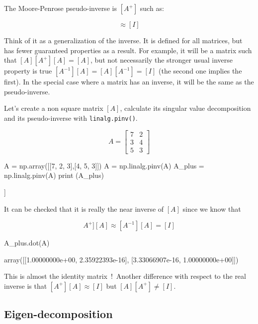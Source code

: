 The Moore-Penrose pseudo-inverse is $[A^+]$ such as:

\begin{equation*}
[A][A^+]\approx[I]
\end{equation*}

Think of it as a generalization of the inverse. It is defined for all matrices, but has fewer guaranteed properties as a result. For example, it will be a matrix such that $[A][A^+][A]=[A]$, but not necessarily the stronger usual inverse property is true $[A^{-1}][A]=[A][A^{-1}]=[I]$ (the second one implies the first). In the special case where a matrix has an inverse, it will be the same as the pseudo-inverse.

Let's create a non square matrix $[A]$, calculate its singular value decomposition and its pseudo-inverse with \texttt{linalg.pinv()}.

\begin{equation*}
A=\begin{bmatrix}
7&2\\
3&4\\
5&3
\end{bmatrix}
\end{equation*}

\begin{ipythonnon}
A = np.array([[7, 2, 3],[4, 5, 3]])
A = np.linalg.pinv(A)
A_plus = np.linalg.pinv(A)
print (A_plus)
\end{ipythonnon}
\begin{ioutput}
[[ 0.16666667 -0.10606061  0.03030303]
 [-0.16666667  0.28787879  0.06060606]]
\end{ioutput}
It can be checked that it is really the near inverse of $[A]$ since we know that

\begin{equation*}
A^{+}][A]\approx[A^{-1}][A]=[I]
\end{equation*}

\begin{ipythonnon}
A_plus.dot(A)
\end{ipythonnon}
\begin{ioutput}
array([[1.00000000e+00, 2.35922393e-16],
       [3.33066907e-16, 1.00000000e+00]])
\end{ioutput}
This is almost the identity matrix~!~Another difference with respect to the real inverse is that $[A^+][A]\approx[I]$ but $[A][A^+]\neq [I]$.

\subsection{Eigen-decomposition}
\label{concatenating-eigenvalues-and-eigenvectors}

